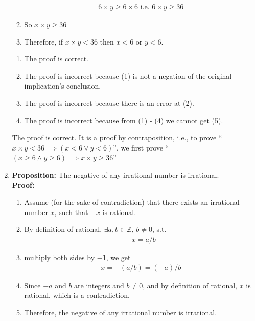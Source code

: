 \documentclass[11pt, preview]{standalone} %
\begin{document}
\begin{enumerate}
\begin{enumerate}[(1)]
    \begin{align*}
      6 \times y \geq 6 \times 6
      \text{ i.e. } 6 \times y \geq 36
    \end{align*}
  \item So $x \times y \geq 36$
  \item Therefore, if $x \times y < 36$ then $x < 6$ or $y < 6$.
  \end{enumerate}
  \begin{Choices}
    \begin{enumerate}
    \TrueChoice\item The proof is correct.
    \FalseChoice\item The proof is incorrect because (1) is not a negation of the
      original implication's conclusion.
    \FalseChoice\item The proof is incorrect because there is an error at (2).
    \FalseChoice\item The proof is incorrect because from (1) - (4) we cannot get (5).
    \end{enumerate}
    \Solution The proof is correct. It is a proof by contraposition, 
    i.e., to prove ``$x \times y < 36 \implies (x < 6 \lor y < 6)$'', 
    we first prove ``$(x \geq 6 \land y \geq 6) \implies x \times y \geq 36$''
  \end{Choices}
\item \textbf{Proposition: } The negative of any irrational number is irrational.\\
  \textbf{Proof: } 
  \begin{enumerate}[(1)]
  \item Assume (for the sake of contradiction) that there exists an
    irrational number $x$, such that $-x$ is rational.
  \item By definition of rational, $\exists a,b \in \mathbb{Z}$, $b\neq 0$, s.t.
    \begin{align*}
      -x = a/b
    \end{align*}
  \item multiply both sides by $-1$, we get
    \begin{align*}
      x = -(a/b) = (-a)/b
    \end{align*}
  \item Since $-a$ and $b$ are integers and $b \neq 0$, and by
    definition of rational, $x$ is rational, which is a contradiction.
  \item Therefore, the negative of any irrational number is irrational.
  \end{enumerate}

\end{enumerate}
\end{document}
